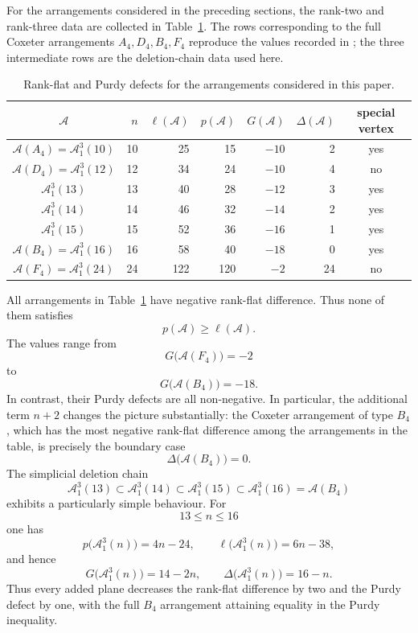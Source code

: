 \documentclass[11pt]{article}
\theoremstyle{definition}
\theoremstyle{remark}
\newcommand{\cA}{\mathcal A}
\begin{document}
For the arrangements considered in the preceding sections, the
rank-two and rank-three data are collected in
Table~\ref{tab:purdy-defects}.  The rows corresponding to the full Coxeter
arrangements $A_4,D_4,B_4,F_4$ reproduce the values recorded in
\cite{MMPP}; the three intermediate rows are the deletion-chain data used
here.

\begin{table}[ht]
\centering
\renewcommand{\arraystretch}{1.15}
\begin{tabular}{c|r|r|r|r|r|c}
\hline
$\cA$
&
$n$
&
$\ell(\cA)$
&
$p(\cA)$
&
$G(\cA)$
&
$\Delta(\cA)$
&
special vertex
\\
\hline
$\cA(A_4)=\cA^3_1(10)$
&10&25&15&$-10$&2&yes\\
$\cA(D_4)=\cA^3_1(12)$
&12&34&24&$-10$&4&no\\
$\cA^3_1(13)$
&13&40&28&$-12$&3&yes\\
$\cA^3_1(14)$
&14&46&32&$-14$&2&yes\\
$\cA^3_1(15)$
&15&52&36&$-16$&1&yes\\
$\cA(B_4)=\cA^3_1(16)$
&16&58&40&$-18$&0&yes\\
$\cA(F_4)=\cA^3_1(24)$
&24&122&120&$-2$&24&no\\
\hline
\end{tabular}
\caption{Rank-flat and Purdy defects for the arrangements considered
in this paper.}
\label{tab:purdy-defects}
\end{table}

All arrangements in Table~\ref{tab:purdy-defects} have negative
rank-flat difference. Thus none of them satisfies
\[
p(\cA)\geq\ell(\cA).
\]
The values range from
\[
G\bigl(\cA(F_4)\bigr)=-2
\]
to
\[
G\bigl(\cA(B_4)\bigr)=-18.
\]
In contrast, their Purdy defects are all non-negative. In particular,
the additional term $n+2$ changes the picture substantially: the
Coxeter arrangement of type $B_4$, which has the most negative
rank-flat difference among the arrangements in the table, is precisely
the boundary case
\[
\Delta\bigl(\cA(B_4)\bigr)=0.
\]
The simplicial deletion chain
\[
\cA^3_1(13)\subset
\cA^3_1(14)\subset
\cA^3_1(15)\subset
\cA^3_1(16)=\cA(B_4)
\]
exhibits a particularly simple behaviour. For
\[
13\leq n\leq16
\]
one has
\[
p\bigl(\cA^3_1(n)\bigr)=4n-24,
\qquad
\ell\bigl(\cA^3_1(n)\bigr)=6n-38,
\]
and hence
\[
G\bigl(\cA^3_1(n)\bigr)=14-2n,
\qquad
\Delta\bigl(\cA^3_1(n)\bigr)=16-n.
\]
Thus every added plane decreases the rank-flat difference by two and
the Purdy defect by one, with the full $B_4$ arrangement attaining
equality in the Purdy inequality.
\end{document}
